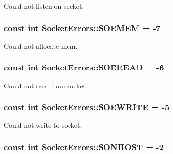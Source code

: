 \-Could not listen on socket. 

\hypertarget{class_socket_errors_ad5d9bd316b2c6f6644cedb7ae245c087}{
\subsubsection[{\-S\-O\-E\-M\-E\-M}]{\setlength{\rightskip}{0pt plus 5cm}const int {\bf \-Socket\-Errors\-::\-S\-O\-E\-M\-E\-M} = -\/7}}
\label{class_socket_errors_ad5d9bd316b2c6f6644cedb7ae245c087}


\-Could not allocate mem. 

\hypertarget{class_socket_errors_a019e0ba92390f1dbea86342d37c5e4b5}{
\subsubsection[{\-S\-O\-E\-R\-E\-A\-D}]{\setlength{\rightskip}{0pt plus 5cm}const int {\bf \-Socket\-Errors\-::\-S\-O\-E\-R\-E\-A\-D} = -\/6}}
\label{class_socket_errors_a019e0ba92390f1dbea86342d37c5e4b5}


\-Could not read from socket. 

\hypertarget{class_socket_errors_afaf22588eba15c91ef59d92ef473c2da}{
\subsubsection[{\-S\-O\-E\-W\-R\-I\-T\-E}]{\setlength{\rightskip}{0pt plus 5cm}const int {\bf \-Socket\-Errors\-::\-S\-O\-E\-W\-R\-I\-T\-E} = -\/5}}
\label{class_socket_errors_afaf22588eba15c91ef59d92ef473c2da}


\-Could not write to socket. 

\hypertarget{class_socket_errors_a46ef9f2c12a6d05f7cd190b6eb51bb83}{
\subsubsection[{\-S\-O\-N\-H\-O\-S\-T}]{\setlength{\rightskip}{0pt plus 5cm}const int {\bf \-Socket\-Errors\-::\-S\-O\-N\-H\-O\-S\-T} = -\/2}}
\label{class_socket_errors_a46ef9f2c12a6d05f7cd190b6eb51bb83}


